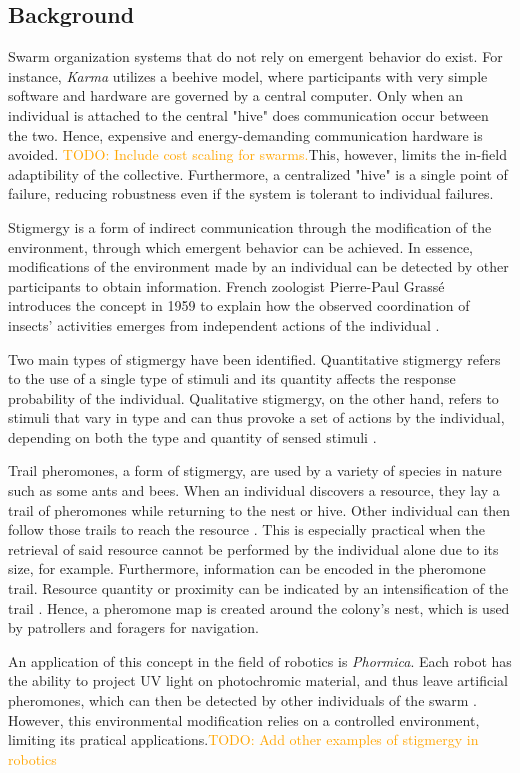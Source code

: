 \documentclass[a4paper, 12pt, times]{article}
\newcommand{\todo}[1]{\textcolor{orange}{TODO: #1}}
\begin{document}
\begin{multicols}{2}
\section{Background}
\par Swarm organization systems that do not rely on emergent behavior do exist. For instance, \textit{Karma} utilizes a beehive model, where participants with very simple software and hardware are governed by a central computer. Only when an individual is attached to the central "hive" does communication occur between the two. Hence, expensive and energy-demanding communication hardware is avoided. \todo{Include cost scaling for swarms.}This, however, limits the in-field adaptibility of the collective. Furthermore, a centralized "hive" is a single point of failure, reducing robustness even if the system is tolerant to individual failures.
\par Stigmergy is a form of indirect communication through the modification of the environment, through which emergent behavior can be achieved. In essence, modifications of the environment made by an individual can be detected by other participants to obtain information. French zoologist Pierre-Paul Grass\'e introduces the concept in 1959 to explain how the observed coordination of insects' activities emerges from independent actions of the individual \parencite{theraulaz_brief_1999}.
\par Two main types of stigmergy have been identified. Quantitative stigmergy refers to the use of a single type of stimuli and its quantity affects the response probability of the individual. Qualitative stigmergy, on the other hand, refers to stimuli that vary in type and can thus provoke a set of actions by the individual, depending on both the type and quantity of sensed stimuli \parencite{theraulaz_brief_1999}.
\par Trail pheromones, a form of stigmergy, are used by a variety of species in nature such as some ants and bees. When an individual discovers a resource, they lay a trail of pheromones while returning to the nest or hive. Other individual can then follow those trails to reach the resource \parencite{carde_encyclopedia_2009}. This is especially practical when the retrieval of said resource cannot be performed by the individual alone due to its size, for example. Furthermore, information can be encoded in the pheromone trail. Resource quantity or proximity can be indicated by an intensification of the trail \parencite{carde_encyclopedia_2009}. Hence, a pheromone map is created around the colony's nest, which is used by patrollers and foragers for navigation.
\par An application of this concept in the field of robotics is \textit{Phormica}. Each robot has the ability to project UV light on photochromic material, and thus leave artificial pheromones, which can then be detected by other individuals of the swarm \parencite{salman_phormica_2020}. However, this environmental modification relies on a controlled environment, limiting its pratical applications.\todo{Add other examples of stigmergy in robotics \parencite{hunt_testing_2019}}

\end{multicols}
\end{document}
